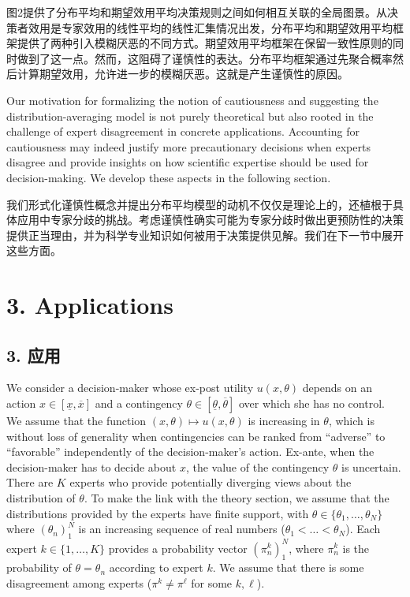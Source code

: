 \documentclass[12pt,a4paper]{article}
\newenvironment{original}
  {\par\noindent\ignorespaces}
  {\par}
\newenvironment{translation}
  {\par\noindent{\color{transblue}\ignorespaces}}
  {\par\medskip}
\begin{document}
\begin{translation}
图2提供了分布平均和期望效用平均决策规则之间如何相互关联的全局图景。从决策者效用是专家效用的线性平均的线性汇集情况出发，分布平均和期望效用平均框架提供了两种引入模糊厌恶的不同方式。期望效用平均框架在保留一致性原则的同时做到了这一点。然而，这阻碍了谨慎性的表达。分布平均框架通过先聚合概率然后计算期望效用，允许进一步的模糊厌恶。这就是产生谨慎性的原因。
\end{translation}

\begin{original}
Our motivation for formalizing the notion of cautiousness and suggesting the distribution-averaging model is not purely theoretical but also rooted in the challenge of expert disagreement in concrete applications. Accounting for cautiousness may indeed justify more precautionary decisions when experts disagree and provide insights on how scientific expertise should be used for decision-making. We develop these aspects in the following section.
\end{original}

\begin{translation}
我们形式化谨慎性概念并提出分布平均模型的动机不仅仅是理论上的，还植根于具体应用中专家分歧的挑战。考虑谨慎性确实可能为专家分歧时做出更预防性的决策提供正当理由，并为科学专业知识如何被用于决策提供见解。我们在下一节中展开这些方面。
\end{translation}

\newpage
\section{3. Applications}
{\color{transblue}\subsection*{3. 应用}}

\begin{original}
We consider a decision-maker whose ex-post utility $u(x, \theta)$ depends on an action $x \in [\underline{x}, \overline{x}]$ and a contingency $\theta \in [\underline{\theta}, \overline{\theta}]$ over which she has no control. We assume that the function $(x, \theta) \mapsto u(x, \theta)$ is increasing in $\theta$, which is without loss of generality when contingencies can be ranked from ``adverse'' to ``favorable'' independently of the decision-maker's action. Ex-ante, when the decision-maker has to decide about $x$, the value of the contingency $\theta$ is uncertain. There are $K$ experts who provide potentially diverging views about the distribution of $\theta$. To make the link with the theory section, we assume that the distributions provided by the experts have finite support, with $\theta \in \{\theta_{1}, \dots, \theta_{N}\}$ where $(\theta_{n})_{1}^{N}$ is an increasing sequence of real numbers ($\theta_{1} < \dots < \theta_{N}$). Each expert $k \in \{1, \dots, K\}$ provides a probability vector $(\pi^{k}_{n})_{1}^{N}$, where $\pi^{k}_{n}$ is the probability of $\theta = \theta_{n}$ according to expert $k$. We assume that there is some disagreement among experts ($\pi^{k} \neq \pi^{\ell}$ for some $k, \ell$).
\end{original}
\end{document}
